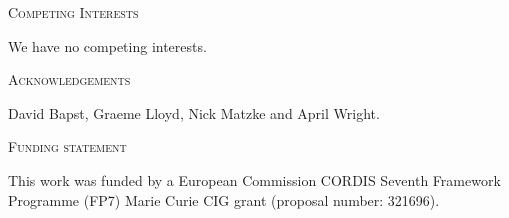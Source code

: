 \documentclass[12pt,letterpaper]{article}
\renewcommand{\section}[1]{%
\bigskip
\begin{center}
\begin{Large}
\normalfont\scshape #1
\medskip
\end{Large}
\end{center}}
\begin{document}
\section{Competing Interests}
We have no competing interests.
\section{Acknowledgements}
David Bapst, Graeme Lloyd, Nick Matzke and April Wright.
\section{Funding statement}
This work was funded by a European Commission CORDIS Seventh Framework Programme (FP7) Marie Curie CIG grant (proposal number: 321696).




\newcommand{\beginsupplement}{%
    \setcounter{table}{0}
    \renewcommand{\thetable}{S\arabic{table}}%
    \setcounter{figure}{0}
    \renewcommand{\thefigure}{S\arabic{figure}}%
}
\beginsupplement



\end{document}
